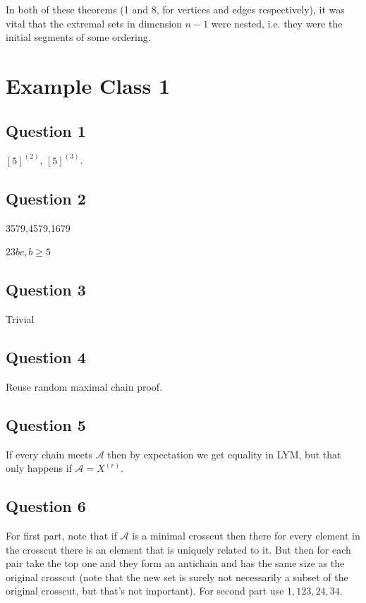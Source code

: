 \documentclass[a4paper]{article}
\begin{document}
\begin{rem}
    In both of these theorems (1 and 8, for vertices and edges respectively), it was vital that the extremal sets in dimension $n-1$ were nested, i.e. they were the initial segments of some ordering.
\end{rem}

\newpage

\section{Example Class 1}

\subsection{Question 1}
$[5]^{(2)}$, $[5]^{(3)}$.

\subsection{Question 2}
3579,4579,1679

$23bc, b \geq 5$

\subsection{Question 3}
Trivial

\subsection{Question 4}
Reuse random maximal chain proof.

\subsection{Question 5}
If every chain meets $\mathcal{A}$ then by expectation we get equality in LYM, but that only happens if $\mathcal{A} = X^{(r)}$.

\subsection{Question 6}
For first part, note that if $\mathcal{A}$ is a minimal crosscut then there for every element in the crosscut there is an element that is uniquely related to it. But then for each pair take the top one and they form an antichain and has the same size as the original crosscut (note that the new set is surely not necessarily a subset of the original crosscut, but that's not important).
For second part use $1,123,24,34$.
\end{document}
